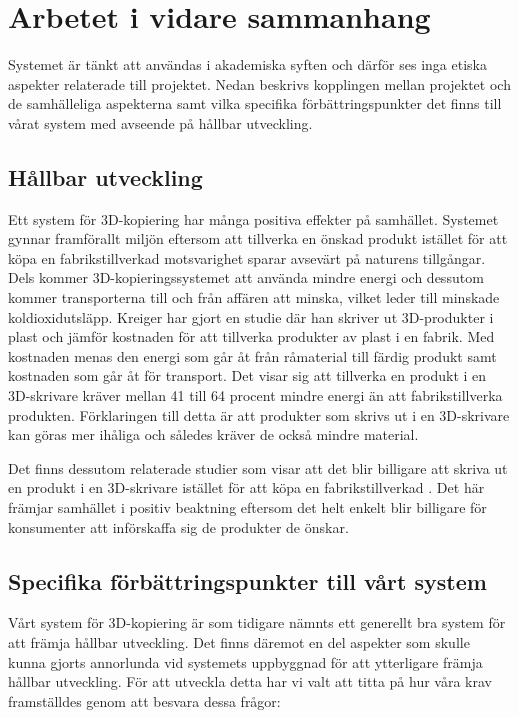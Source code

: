 \section{Arbetet i vidare sammanhang}
\label{sec:work-wider-context}

Systemet är tänkt att användas i akademiska syften och därför ses inga etiska aspekter relaterade till projektet. Nedan beskrivs kopplingen mellan projektet och de samhälleliga aspekterna samt vilka specifika förbättringspunkter det finns till vårat system med avseende på hållbar utveckling.

\subsection{Hållbar utveckling}
\label{disc:hållbar_utveckling}
Ett system för 3D-kopiering har många positiva effekter på samhället. Systemet gynnar framförallt miljön eftersom att tillverka en önskad produkt istället för att köpa en fabrikstillverkad motsvarighet sparar avsevärt på naturens tillgångar. Dels kommer 3D-kopieringssystemet att använda mindre energi och dessutom kommer transporterna till och från affären att minska, vilket leder till minskade koldioxidutsläpp. Kreiger \cite{kreiger2013environmental} har gjort en studie där han skriver ut 3D-produkter i plast och jämför kostnaden för att tillverka produkter av plast i en fabrik. Med kostnaden menas den energi som går åt från råmaterial till färdig produkt samt kostnaden som går åt för transport. Det visar sig att tillverka en produkt i en 3D-skrivare kräver mellan 41 till 64 procent mindre energi än att fabrikstillverka produkten. Förklaringen till detta är att produkter som skrivs ut i en 3D-skrivare kan göras mer ihåliga och således kräver de också mindre material. 

Det finns dessutom relaterade studier som visar att det blir billigare att skriva ut en produkt i en 3D-skrivare istället för att köpa en fabrikstillverkad \cite{wittbrodt2013life}. Det här främjar samhället i positiv beaktning eftersom det helt enkelt blir billigare för konsumenter att införskaffa sig de produkter de önskar. 

\subsection{Specifika förbättringspunkter till vårt system}
Vårt system för 3D-kopiering är som tidigare nämnts ett generellt bra system för att främja hållbar utveckling. Det finns däremot en del aspekter som skulle kunna gjorts annorlunda vid systemets uppbyggnad för att ytterligare främja hållbar utveckling. För att utveckla detta har vi valt att titta på hur våra krav framställdes genom att besvara dessa frågor:

